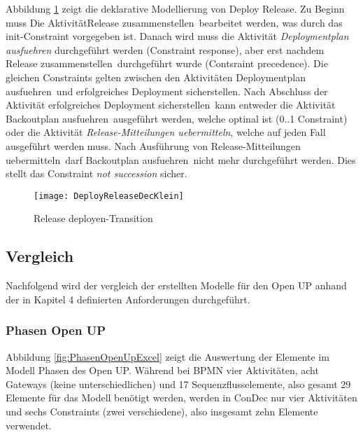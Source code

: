 Abbildung \ref{fig:DeployReleaseDecKlein} zeigt die deklarative Modellierung von Deploy Release.\newline
Zu Beginn muss Die Aktivität\grqq Release zusammenstellen\grqq \ bearbeitet werden, was durch das init-Constraint vorgegeben ist. Danach wird muss die Aktivität \textit{Deploymentplan ausfuehren} durchgeführt werden (Constraint response), aber erst nachdem \grqq Release zusammenstellen\grqq \ durchgeführt wurde (Contsraint precedence).\newline
Die gleichen Constraints gelten zwischen den Aktivitäten \grqq Deploymentplan ausfuehren\grqq \ und \grqq erfolgreiches Deployment sicherstellen\grqq.\newline
Nach Abschluss der Aktivität \grqq erfolgreiches Deployment sicherstellen\grqq \ kann entweder die Aktivität \grqq Backoutplan ausfuehren\grqq \ ausgeführt werden, welche optinal ist (0..1 Constraint) oder die Aktivität \textit{Release-Mitteilungen uebermitteln}, welche auf jeden Fall ausgeführt werden muss.\newline 
Nach Ausführung von \grqq Release-Mitteilungen uebermitteln\grqq \ darf \grqq Backoutplan ausfuehren\grqq \ nicht mehr durchgeführt werden. Dies stellt das Constraint \textit{not succession} sicher.
\begin{figure}[htp]
\begin{center}
  \texttt{[image: DeployReleaseDecKlein]} %
  \caption{Release deployen-Transition}
  \label{fig:DeployReleaseDecKlein}
\end{center}
\end{figure}

\clearpage

\subsection{Vergleich}

Nachfolgend wird der vergleich der erstellten Modelle für den Open UP anhand der in Kapitel 4 definierten Anforderungen durchgeführt.

\subsubsection {Phasen Open UP}


Abbildung \ref{fig:PhasenOpenUpExcel} zeigt die Auswertung der Elemente im Modell Phasen des Open UP. Während bei BPMN vier Aktivitäten, acht Gateways (keine unterschiedlichen) und 17 Sequenzflusselemente, also gesamt 29 Elemente für das Modell benötigt werden, werden in ConDec nur vier Aktivitäten und sechs Constraints (zwei verschiedene), also insgesamt zehn Elemente verwendet.

